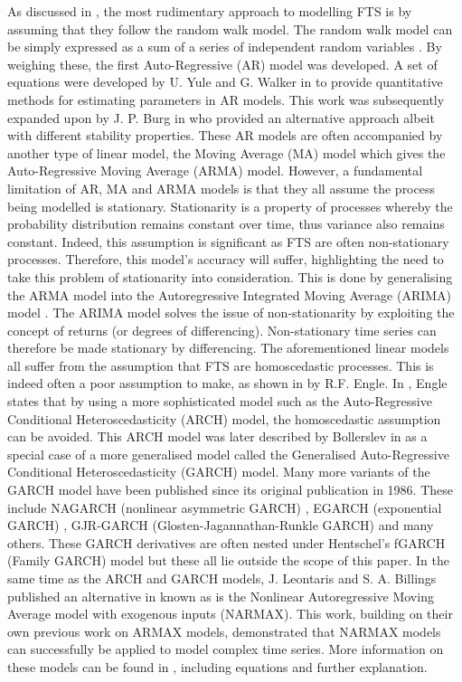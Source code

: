 \documentclass{article}
\begin{document}
As discussed in \cite{hollis2018deep}, the most rudimentary approach to modelling FTS is by assuming that they follow the random walk model. The random walk model can be simply expressed as a sum of a series of independent random variables \cite{hamilton1994time}. By weighing these, the first Auto-Regressive (AR) model was developed. A set of equations were developed by U. Yule and G. Walker in \cite{walker1931periodicity} to provide quantitative methods for estimating parameters in AR models. This work was subsequently expanded upon by J. P. Burg in \cite{burg1968new} who provided an alternative approach albeit with different stability properties. These AR models are often accompanied by another type of linear model, the Moving Average (MA) model which gives the Auto-Regressive Moving Average (ARMA) model. However, a fundamental limitation of AR, MA and ARMA models is that they all assume the process being modelled is stationary. Stationarity is a property of processes whereby the probability distribution remains constant over time, thus variance also remains constant. Indeed, this assumption is significant as FTS are often non-stationary processes. Therefore, this model’s accuracy will suffer, highlighting the need to take this problem of stationarity into consideration. This is done by generalising the ARMA model into the Autoregressive Integrated Moving Average (ARIMA) model \cite{hamilton1994time}. The ARIMA model solves the issue of non-stationarity by exploiting the concept of returns (or degrees of differencing). Non-stationary time series can therefore be made stationary by differencing. The aforementioned linear models all suffer from the assumption that FTS are homoscedastic processes. This is indeed often a poor assumption to make, as shown in \cite{engle1982autoregressive} by R.F. Engle. In \cite{engle1982autoregressive}, Engle states that by using a more sophisticated model such as the Auto-Regressive Conditional Heteroscedasticity (ARCH) model, the homoscedastic assumption can be avoided. This ARCH model was later described by Bollerslev in \cite{bollerslev1986generalized} as a special case of a more generalised model called the Generalised Auto-Regressive Conditional Heteroscedasticity (GARCH) model. Many more variants of the GARCH model have been published since its original publication in 1986. These include NAGARCH (nonlinear asymmetric GARCH) \cite{engle1993measuring}, EGARCH (exponential GARCH) \cite{pierre1998estimating}, GJR-GARCH (Glosten-Jagannathan-Runkle GARCH) \cite{hamzaoui2016glosten} and many others. These GARCH derivatives are often nested under Hentschel’s fGARCH (Family GARCH) model \cite{hentschel1995all} but these all lie outside the scope of this paper. In the same time as the ARCH and GARCH models, J. Leontaris and S. A. Billings published an alternative in \cite{chen1989representations} known as is the Nonlinear Autoregressive Moving Average model with exogenous inputs (NARMAX). This work, building on their own previous work on ARMAX models, demonstrated that NARMAX models can successfully be applied to model complex time series. More information on these models can be found in \cite{hollis2018deep}, including equations and further explanation. 
				
\end{document}
